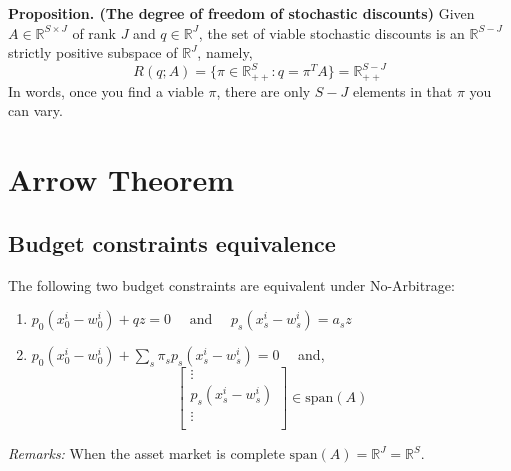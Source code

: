 \begin{tcolorbox}
\textbf{Proposition. (The degree of freedom of stochastic discounts)}
Given $A \in \mathbb{R}^{S\times J}$ of rank $J$ and $q \in \mathbb{R}^J$, the set of viable stochastic discounts 
is an $\mathbb{R}^{S-J}$ strictly positive subspace of $\mathbb{R}^J$, namely,
\[
R(q;A)  = \{\pi \in \mathbb{R}^S_{++}: q = \pi^T A \} = \mathbb{R}^{S-J}_{++}
\]
In words, once you find a viable $\pi$, there are only $S-J$ elements in that $\pi$ you can vary.
\end{tcolorbox}



\section{Arrow Theorem}
\subsection{Budget constraints equivalence}
\begin{proposition}
  \label{prop:equiv_constraints_FME}
  The following two budget constraints are equivalent under No-Arbitrage:
  \begin{enumerate}
    \item $p_0 (x_0^i - w_0^i) + q z = 0 \quad \text{ and } \quad  p_s (x_s^i - w_s^i) = a_s z$
    \item $p_0 (x_0^i - w_0^i) + \sum_s \pi_s p_s (x_s^i - w_s^i) = 0 \quad$ and, 
    \[
    \begin{bmatrix} 
      \vdots \\
      p_s (x_s^i - w_s^i) \\
      \vdots \\
    \end{bmatrix} \in \text{span}(A)
    \]
  \end{enumerate}
\end{proposition}
\noindent \textit{Remarks:} When the asset market is complete $\text{span}(A) = \mathbb{R}^{J} = \mathbb{R}^{S}$.

